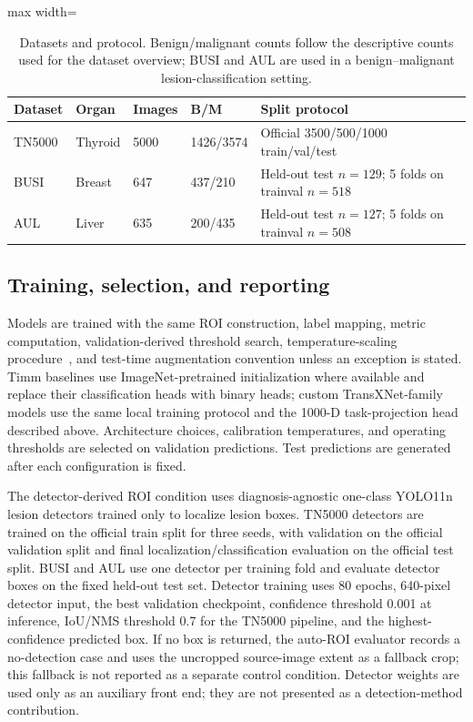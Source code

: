 \documentclass[preprint,12pt]{elsarticle}
\begin{document}
\begin{table}[!htbp]
    \centering
    \small
    \caption{Datasets and protocol. Benign/malignant counts follow the descriptive counts used for the dataset overview; BUSI and AUL are used in a benign--malignant lesion-classification setting.}
    \label{tab:datasets}
    \begin{adjustbox}{max width=\columnwidth}
    \begin{tabular}{lllll}
        \toprule
        Dataset & Organ & Images & B/M & Split protocol \\
        \midrule
        TN5000 & Thyroid & 5000 & 1426/3574 & Official 3500/500/1000 train/val/test \\
        BUSI & Breast & 647 & 437/210 & Held-out test $n=129$; 5 folds on trainval $n=518$ \\
        AUL & Liver & 635 & 200/435 & Held-out test $n=127$; 5 folds on trainval $n=508$ \\
        \bottomrule
    \end{tabular}
    \end{adjustbox}
\end{table}

\subsection{Training, selection, and reporting}

Models are trained with the same ROI construction, label mapping, metric computation, validation-derived threshold search, temperature-scaling procedure~\cite{guo2017calibration}, and test-time augmentation convention unless an exception is stated. Timm baselines use ImageNet-pretrained initialization where available and replace their classification heads with binary heads; custom TransXNet-family models use the same local training protocol and the 1000-D task-projection head described above. Architecture choices, calibration temperatures, and operating thresholds are selected on validation predictions. Test predictions are generated after each configuration is fixed.

The detector-derived ROI condition uses diagnosis-agnostic one-class YOLO11n lesion detectors trained only to localize lesion boxes. TN5000 detectors are trained on the official train split for three seeds, with validation on the official validation split and final localization/classification evaluation on the official test split. BUSI and AUL use one detector per training fold and evaluate detector boxes on the fixed held-out test set. Detector training uses 80 epochs, 640-pixel detector input, the best validation checkpoint, confidence threshold 0.001 at inference, IoU/NMS threshold 0.7 for the TN5000 pipeline, and the highest-confidence predicted box. If no box is returned, the auto-ROI evaluator records a no-detection case and uses the uncropped source-image extent as a fallback crop; this fallback is not reported as a separate control condition. Detector weights are used only as an auxiliary front end; they are not presented as a detection-method contribution.
\end{document}
